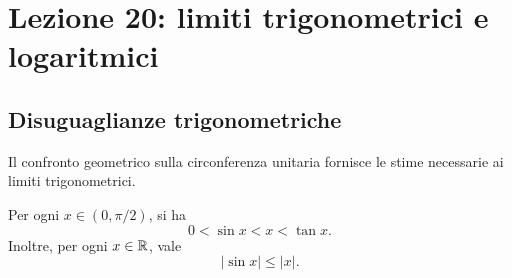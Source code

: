 \chapter[Lezione 20 --- 18 novembre 2026]{Lezione 20: limiti trigonometrici e logaritmici}
\label{chap:lezione-20}

\section{Disuguaglianze trigonometriche}
\label{sec:lez20-disuguaglianze-trigonometriche}

Il confronto geometrico sulla circonferenza unitaria
fornisce le stime necessarie ai limiti trigonometrici.

\begin{proposition}
\label{prop:lez20-disuguaglianze-seno}
Per ogni \(x\in(0,\pi/2)\), si ha
\[
  0<\sin x<x<\tan x.
\]
Inoltre, per ogni \(x\in\mathbb{R}\), vale
\[
  |\sin x|\le|x|.
\]
\end{proposition}

